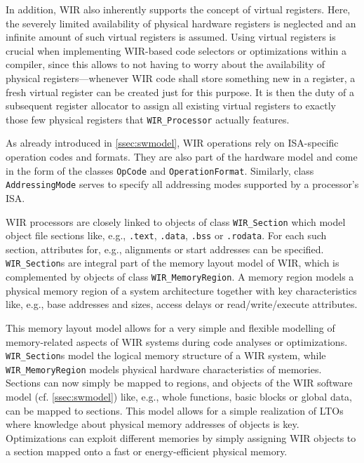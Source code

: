 In addition, \gls{WIR} also inherently supports the concept of virtual registers.
Here, the severely limited availability of physical hardware registers is neglected and an infinite amount of such virtual registers is assumed.
Using virtual registers is crucial when implementing \gls{WIR}-based code selectors or optimizations within a compiler, since this allows to not having to worry about the availability of physical registers---whenever \gls{WIR} code shall store something new in a register, a fresh virtual register can be created just for this purpose.
It is then the duty of a subsequent register allocator to assign all existing virtual registers to exactly those few physical registers that \texttt{WIR\_Processor} actually features.

As already introduced in \cref{ssec:swmodel}, \gls{WIR} operations rely on \gls{ISA}-specific operation codes and formats.
They are also part of the hardware model and come in the form of the classes \texttt{OpCode} and \texttt{OperationFormat}.
Similarly, class \texttt{AddressingMode} serves to specify all addressing modes supported by a processor's \gls{ISA}.

\gls{WIR} processors are closely linked to objects of class \texttt{WIR\_Section} which model object file sections like, e.g., \texttt{.text}, \texttt{.data}, \texttt{.bss} or \texttt{.rodata}.
For each such section, attributes for, e.g., alignments or start addresses can be specified.
\texttt{WIR\_Section}s are integral part of the memory layout model of \gls{WIR}, which is complemented by objects of class \texttt{WIR\_MemoryRegion}.
A memory region models a physical memory region of a system architecture together with key characteristics like, e.g., base addresses and sizes, access delays or read/write/execute attributes.

This memory layout model allows for a very simple and flexible modelling of memory-related aspects of \gls{WIR} systems during code analyses or optimizations.
\texttt{WIR\_Section}s model the logical memory structure of a \gls{WIR} system, while \texttt{WIR\_MemoryRegion} models physical hardware characteristics of memories.
Sections can now simply be mapped to regions, and objects of the \gls{WIR} software model (cf. \cref{ssec:swmodel}) like, e.g., whole functions, basic blocks or global data, can be mapped to sections.
This model allows for a simple realization of \glspl{LTO} where knowledge about physical memory addresses of objects is key.
Optimizations can exploit different memories by simply assigning \gls{WIR} objects to a section mapped onto a fast or energy-efficient physical memory.

